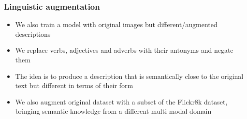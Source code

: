 \documentclass[aspectratio=1610]{beamer} %
\newcommand{\squeezeup}{\vspace{-3mm}}
\newcommand{\squeezedown}{\vspace{2.5mm}}
\begin{document}
\begin{frame}
\frametitle{Linguistic augmentation}

\vspace{-.3cm}
\begin{figure}[htbp]
\centering
{}
  \qquad
\hspace{.5cm}

\label{fig:lingaug}
\end{figure}
\vspace{-.5cm}
\begin{itemize}

	\item We also train a model with original images but different/augmented descriptions
	\item We replace verbs, adjectives and adverbs with their antonyms and negate them
	\item The idea is to produce a description that is semantically close to the original text but different in terms of their form %
	\item We also augment original dataset with a subset of the Flickr8k dataset, bringing semantic knowledge from a different multi-modal domain

\end{itemize}
\end{frame}
\end{document}
